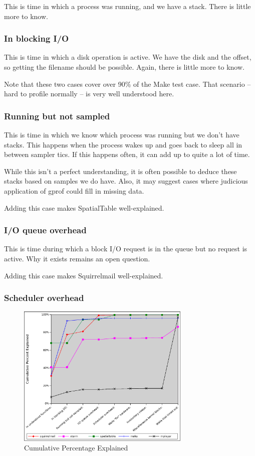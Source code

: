 \documentclass[10pt]{article}
\begin{document}
This is time in which a process was running, and we have a stack.  There is little more to know.

\subsubsection{In blocking I/O}

This is time in which a disk operation is active.  We have the disk and the offset, so getting the filename should be possible.  Again, there is little more to know.

Note that these two cases cover over 90\% of the Make test case.  That scenario -- hard to profile normally -- is very well understood here.

\subsubsection{Running but not sampled}

This is time in which we know which process was running but we don't have stacks.  This happens when the process wakes up and goes back to sleep all in between sampler tics.  If this happens often, it can add up to quite a lot of time.

While this isn't a perfect understanding, it is often possible to deduce these stacks based on samples we do have.  Also, it may suggest cases where judicious application of gprof could fill in missing data.

Adding this case makes SpatialTable well-explained.

\subsubsection{I/O queue overhead}

This is time during which a block I/O request is in the queue but no request is active.  Why it exists remains an open question.

Adding this case makes Squirrelmail well-explained.

\subsubsection{Scheduler overhead}
\begin{figure}[b!]
\includegraphics[width=3.25in]{5cumugraph}
\caption{Cumulative Percentage Explained}
\label{fig:resgraph}
\end{figure}
\end{document}
